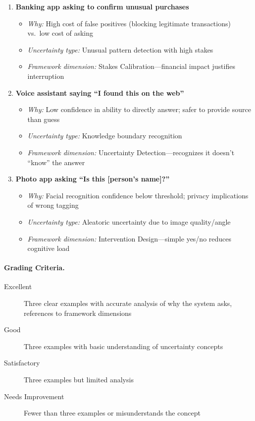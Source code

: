 \begin{enumerate}
    \item \textbf{Banking app asking to confirm unusual purchases}
        \begin{itemize}
            \item \emph{Why:} High cost of false positives (blocking legitimate transactions) vs.\ low cost of asking
            \item \emph{Uncertainty type:} Unusual pattern detection with high stakes
            \item \emph{Framework dimension:} Stakes Calibration---financial impact justifies interruption
        \end{itemize}

    \item \textbf{Voice assistant saying ``I found this on the web''}
        \begin{itemize}
            \item \emph{Why:} Low confidence in ability to directly answer; safer to provide source than guess
            \item \emph{Uncertainty type:} Knowledge boundary recognition
            \item \emph{Framework dimension:} Uncertainty Detection---recognizes it doesn't ``know'' the answer
        \end{itemize}

    \item \textbf{Photo app asking ``Is this [person's name]?''}
        \begin{itemize}
            \item \emph{Why:} Facial recognition confidence below threshold; privacy implications of wrong tagging
            \item \emph{Uncertainty type:} Aleatoric uncertainty due to image quality/angle
            \item \emph{Framework dimension:} Intervention Design---simple yes/no reduces cognitive load
        \end{itemize}
\end{enumerate}

\paragraph{Grading Criteria.}
\begin{description}
    \item[Excellent] Three clear examples with accurate analysis of why the system asks, references to framework dimensions
    \item[Good] Three examples with basic understanding of uncertainty concepts
    \item[Satisfactory] Three examples but limited analysis
    \item[Needs Improvement] Fewer than three examples or misunderstands the concept
\end{description}

